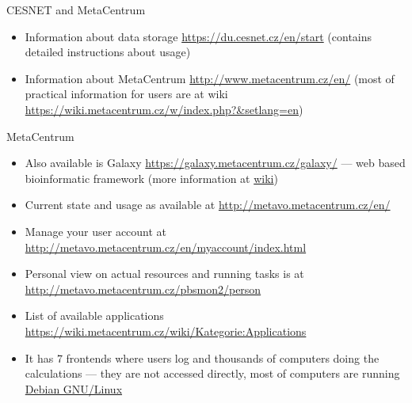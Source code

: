 \documentclass[hyperref={bookmarks=true, unicode=true, colorlinks=true, pdftitle={Linux, command line and MetaCentrum}, plainpages=false, pdfauthor={Vojtech Zeisek}, pdfsubject={Course about use of Linux command line, writing shell scripts and using MetaCentrum of CESNET}, pdfcreator={XeLaTeX, http://www.xelatex.org/}, pdfkeywords={Linux, GNU, BASH, shell, command line, MetaCentrum}, linkcolor=Sienna, anchorcolor=black, citecolor=green, filecolor=magenta, menucolor=Sienna, urlcolor=cyan, pdftex}, compress, ucs, xelatex, xcolor=svgnames, 11pt]{beamer}
\begin{document}
\begin{frame}[allowframebreaks]{CESNET and MetaCentrum}
\begin{itemize}
\begin{itemize}
  \end{itemize}
  \item Information about data storage \href{https://du.cesnet.cz/en/start}{https://du.cesnet.cz/en/start} (contains detailed instructions about usage)
  \item Information about MetaCentrum \href{http://www.metacentrum.cz/en/}{http://www.metacentrum.cz/en/} (most of practical information for users are at wiki \href{https://wiki.metacentrum.cz/w/index.php?title=Main_Page&setlang=en}{https://wiki.metacentrum.cz/w/index.php?\&setlang=en})
\end{itemize}
\end{frame}

\begin{frame}{MetaCentrum}
\begin{itemize}
  \item Also available is Galaxy \href{https://galaxy.metacentrum.cz/galaxy/}{https://galaxy.metacentrum.cz/galaxy/} --- web based bioinformatic framework (more information at \href{https://wiki.metacentrum.cz/wiki/Galaxy_application}{wiki})
  \item Current state and usage as available at \href{http://metavo.metacentrum.cz/en/}{http://metavo.metacentrum.cz/en/}
  \item Manage your user account at \href{http://metavo.metacentrum.cz/en/myaccount/index.html}{http://metavo.metacentrum.cz/en/myaccount/index.html}
  \item Personal view on actual resources and running tasks is at \href{http://metavo.metacentrum.cz/pbsmon2/person}{http://metavo.metacentrum.cz/pbsmon2/person}
  \item List of available applications \href{https://wiki.metacentrum.cz/wiki/Kategorie:Applications}{https://wiki.metacentrum.cz/wiki/Kategorie:Applications}
  \item It has 7 frontends where users log and thousands of computers doing the calculations --- they are not accessed directly, most of computers are running \href{https://www.debian.org/}{Debian GNU/Linux}
\end{itemize}
\end{frame}
\end{document}
